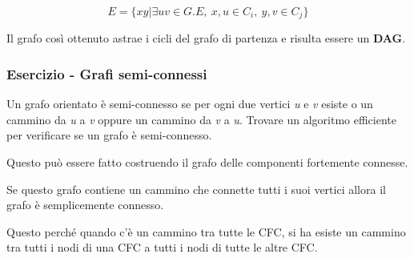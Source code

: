 $$ 
E = \{xy | \exists uv \in G.E, \: x,u \in C_i, \: y,v \in C_j\}
$$

Il grafo così ottenuto astrae i cicli del grafo di partenza e risulta essere un \textbf{DAG}.

\subsubsection{Esercizio - Grafi semi-connessi}\label{esercizio---grafi-semiconnessi}

Un grafo orientato è semi-connesso se per ogni due vertici \emph{u} e
\emph{v} esiste o un cammino da \emph{u} a \emph{v} oppure un cammino da
\emph{v} a \emph{u}. Trovare un algoritmo efficiente per verificare se
un grafo è semi-connesso.

Questo può essere fatto costruendo il grafo delle componenti fortemente
connesse.

Se questo grafo contiene un cammino che connette tutti i suoi vertici allora il grafo è semplicemente connesso.

Questo perché quando c'è un cammino tra tutte le CFC, si ha esiste un cammino tra tutti i nodi di una CFC a tutti i nodi di tutte le altre CFC.

